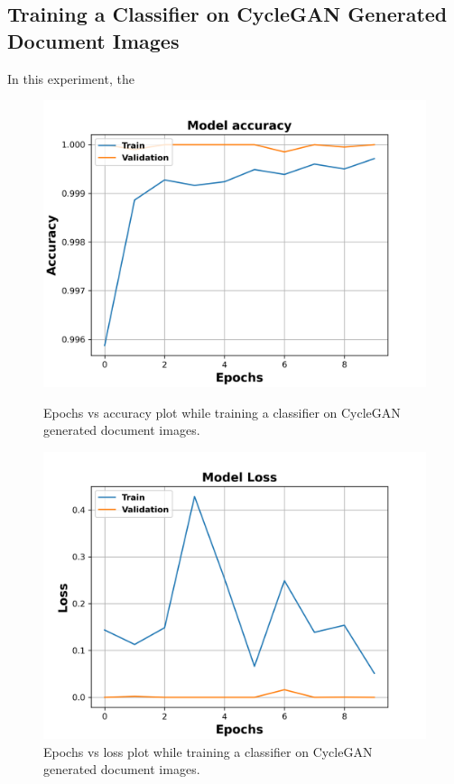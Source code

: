 \subsection{Training a Classifier on \ac{CycleGAN} Generated Document Images}

In this experiment, the 


\begin{figure}[H]
  \centering
  \begin{minipage}[b]{0.45\textwidth}
    \includegraphics[width=\textwidth]{images/Evaluation/CycleGAN_Generated_Data_Classifier_2021-06-02_21-55-39_Accuracy.png}
    \caption[Epochs vs accuracy plot while training a classifier on \ac{CycleGAN} generated document images.]{Epochs vs accuracy plot while training a classifier  on \ac{CycleGAN} generated document images.}
    \label{fig:SyntheticClassifierAcc}
  \end{minipage}
  \hfill
  \begin{minipage}[b]{0.45\textwidth}
    \includegraphics[width=\textwidth]{images/Evaluation/CycleGAN_Generated_Data_Classifier_2021-06-02_21-55-39_Loss.png}
    \caption[Epochs vs loss plot while training a classifier on \ac{CycleGAN} generated document images.]{Epochs vs loss plot while training a classifier on \ac{CycleGAN} generated document images.}
    \label{fig:SyntheticClassifierLoss}
  \end{minipage}
\end{figure}


